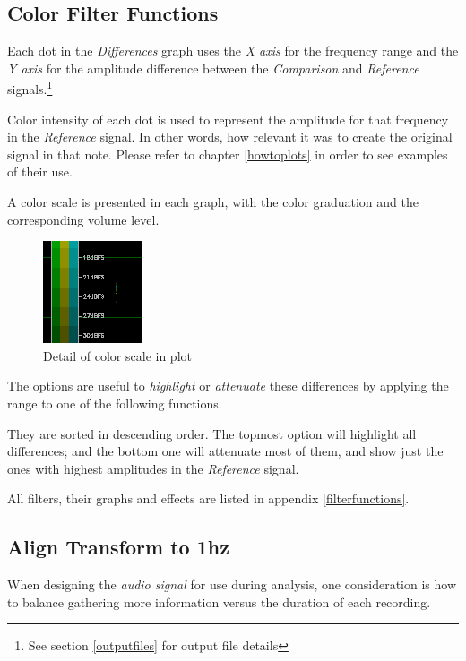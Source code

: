 \documentclass[10pt,a4paper]{report}
\begin{document}
\subsection{Color Filter Functions}
\label{colorfilter}

Each dot in the \textit{Differences} graph uses the \textit{X axis} for the frequency range and the \textit{Y axis} for the amplitude difference between the \textit{Comparison} and \textit{Reference} signals.\footnote{See section \ref{outputfiles} for output file details}

Color intensity of each dot is used to represent the amplitude for that frequency in the \textit{Reference} signal. In other words, how relevant it was to create the original signal in that note. Please refer to chapter \ref{howtoplots} in order to see examples of their use.

A color scale is presented in each graph, with the color graduation and the corresponding volume level.

\begin{figure}[H]
	\centering
	\includegraphics[width=0.2\linewidth]{plots/colorscale.png}
	\caption[Plot color scale]{Detail of color scale in plot}
	\label{fig:colorscale}
\end{figure}

The options are useful to \textit{highlight} or \textit{attenuate} these differences by applying the range to one of the following functions. 

They are sorted in descending order. The topmost option will highlight all differences; and the bottom one will attenuate most of them, and show just the ones with highest amplitudes in the \textit{Reference} signal.

All filters, their graphs and effects are listed in appendix \ref{filterfunctions}.

\subsection{Align Transform to 1hz}

When designing the \textit{audio signal} for use during analysis, one consideration is how to balance gathering more information versus the duration of each recording. 
\end{document}
